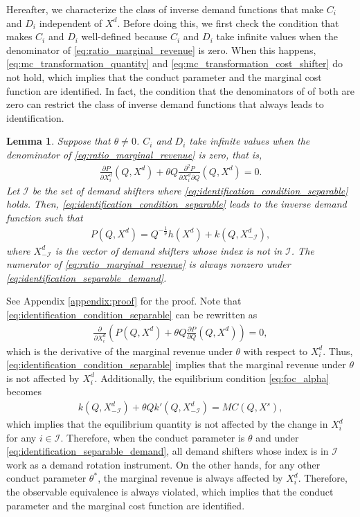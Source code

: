 \documentclass[11pt, a4paper]{article}
\newtheorem{lemma}{Lemma}
\theoremstyle{remark}
\begin{document}
Hereafter, we characterize the class of inverse demand functions that make $C_i$ and $D_i$ independent of $X^{d}$.
Before doing this, we first check the condition that makes $C_i$ and $D_i$ well-defined because $C_i$ and $D_i$ take infinite values when the denominator of \eqref{eq:ratio_marginal_revenue} is zero.
When this happens, \eqref{eq:mc_transformation_quantity} and \eqref{eq:mc_transformation_cost_shifter} do not hold, which implies that the conduct parameter and the marginal cost function are identified.
In fact, the condition that the denominators of of both are zero can restrict the class of inverse demand functions that always leads to identification.
\begin{lemma}\label{lemma:identification_condition_separable}
    Suppose that $\theta \ne 0$. $C_i$ and $D_i$ take infinite values when the denominator of \eqref{eq:ratio_marginal_revenue} is zero, that is, 
    \begin{align}
        \frac{\partial P}{\partial X^{d}_i}(Q, X^{d}) + \theta Q\frac{\partial^2 P}{\partial X^{d}_{i}\partial Q}(Q, X^{d}) = 0. \label{eq:identification_condition_separable}
    \end{align}
    Let $\mathcal{I}$ be the set of demand shifters where \eqref{eq:identification_condition_separable} holds.
    Then, \eqref{eq:identification_condition_separable} leads to the inverse demand function such that
    \begin{align}
        P(Q, X^{d}) = Q^{-\frac{1}{\theta}}h(X^{d}) + k(Q, X^{d}_{-\mathcal{I}}), \label{eq:identification_separable_demand}
    \end{align}
    where $X^{d}_{-\mathcal{I}}$ is the vector of demand shifters whose index is not in $\mathcal{I}$.
    The numerator of \eqref{eq:ratio_marginal_revenue} is always nonzero under \eqref{eq:identification_separable_demand}.
\end{lemma}
See Appendix \ref{appendix:proof} for the proof.
Note that \eqref{eq:identification_condition_separable} can be rewritten as
\begin{align}
    \frac{\partial }{\partial X^{d}_i}\left( P(Q, X^{d}) + \theta Q \frac{\partial P}{\partial Q}(Q, X^{d})\right) = 0,
\end{align}
which is the derivative of the marginal revenue under $\theta$ with respect to $X^{d}_i$.
Thus, \eqref{eq:identification_condition_separable} implies that the marginal revenue under $\theta$ is not affected by $X^{d}_i$.
Additionally, the equilibrium condition \eqref{eq:foc_alpha} becomes
\begin{align}
    k(Q, X^{d}_{-\mathcal{I}}) + \theta Qk'(Q, X^{d}_{-\mathcal{I}}) = MC(Q, X^{s}),
\end{align}
which implies that the equilibrium quantity is not affected by the change in $X^{d}_i$ for any $i \in \mathcal{I}$.
Therefore, when the conduct parameter is $\theta$ and under \eqref{eq:identification_separable_demand}, all demand shifters whose index is in $\mathcal{I}$ work as a demand rotation instrument.
On the other hands, for any other conduct parameter $\theta^{*}$, the marginal revenue is always affected by $X^{d}_i$.
Therefore, the observable equivalence is always violated, which implies that the conduct parameter and the marginal cost function are identified.
\end{document}

